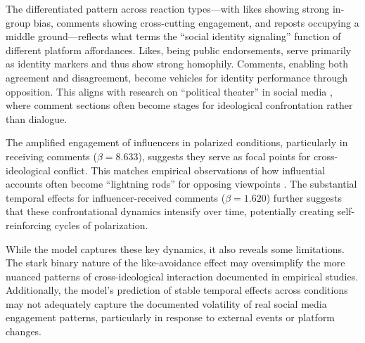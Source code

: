 The differentiated pattern across reaction types---with likes showing strong in-group bias, comments showing cross-cutting engagement, and reposts occupying a middle ground---reflects what \citet{bail_breaking_2018} terms the ``social identity signaling'' function of different platform affordances. Likes, being public endorsements, serve primarily as identity markers and thus show strong homophily. Comments, enabling both agreement and disagreement, become vehicles for identity performance through opposition. This aligns with research on ``political theater'' in social media \citep{an_political_2019}, where comment sections often become stages for ideological confrontation rather than dialogue.

The amplified engagement of influencers in polarized conditions, particularly in receiving comments ($\beta = 8.633$), suggests they serve as focal points for cross-ideological conflict. This matches empirical observations of how influential accounts often become ``lightning rods'' for opposing viewpoints \citep{soares_influencers_2018}. The substantial temporal effects for influencer-received comments ($\beta = 1.620$) further suggests that these confrontational dynamics intensify over time, potentially creating self-reinforcing cycles of polarization.

While the model captures these key dynamics, it also reveals some limitations. The stark binary nature of the like-avoidance effect may oversimplify the more nuanced patterns of cross-ideological interaction documented in empirical studies. Additionally, the model's prediction of stable temporal effects across conditions may not adequately capture the documented volatility of real social media engagement patterns, particularly in response to external events or platform changes.



